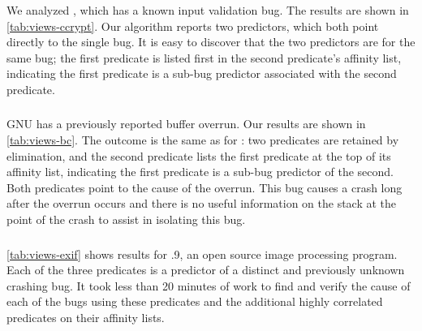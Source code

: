 We analyzed , which has a known input validation bug.  The
results are shown in \autoref{tab:views-ccrypt}.  Our algorithm
reports two predictors, which both point directly to the single bug.
It is easy to discover that the two predictors are for the same bug;
the first predicate is listed first in the second predicate's affinity
list, indicating the first predicate is a sub-bug predictor associated
with the second predicate.

\subsubsection{\bc}


GNU  has a previously reported buffer overrun.  Our results
are shown in \autoref{tab:views-bc}.  The outcome is the same as for
\ccrypt: two predicates are retained by elimination, and the second
predicate lists the first predicate at the top of its affinity list,
indicating the first predicate is a sub-bug predictor of the second.
Both predicates point to the cause of the overrun.  This bug causes a
crash long after the overrun occurs and there is no useful information
on the stack at the point of the crash to assist in isolating this
bug.

\subsubsection{\exif}


\autoref{tab:views-exif} shows results for .9, an open source
image processing program.  Each of the three predicates is a predictor
of a distinct and previously unknown crashing bug.  It took less than
20 minutes of work to find and verify the cause of each of the bugs
using these predicates and the additional highly correlated predicates
on their affinity lists.

